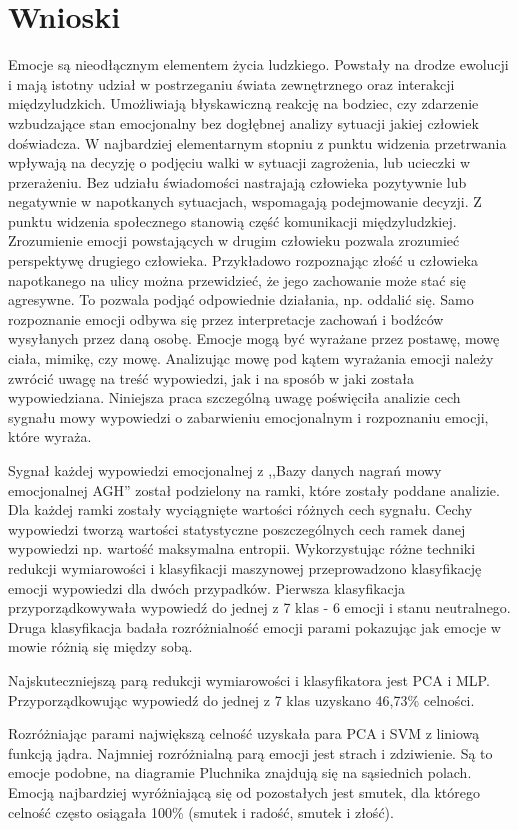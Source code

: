 \documentclass[a4paper,12pt,twoside,openany]{report}
\begin{document}
\chapter{Wnioski}
Emocje są nieodłącznym elementem życia ludzkiego. 
Powstały na drodze ewolucji i mają istotny udział w postrzeganiu świata zewnętrznego oraz interakcji międzyludzkich.
Umożliwiają błyskawiczną reakcję na bodziec, czy zdarzenie wzbudzające stan emocjonalny bez dogłębnej analizy sytuacji jakiej człowiek doświadcza.
W najbardziej elementarnym stopniu z punktu widzenia przetrwania wpływają na decyzję o podjęciu walki w sytuacji zagrożenia, lub ucieczki w przerażeniu.
Bez udziału świadomości nastrajają człowieka pozytywnie lub negatywnie w napotkanych sytuacjach, wspomagają podejmowanie decyzji.
Z punktu widzenia społecznego stanowią część komunikacji międzyludzkiej.
Zrozumienie emocji powstających w drugim człowieku pozwala zrozumieć perspektywę drugiego człowieka.
Przykładowo rozpoznając złość u człowieka napotkanego na ulicy można przewidzieć, że jego zachowanie może stać się agresywne.
To pozwala podjąć odpowiednie działania, np. oddalić się.
Samo rozpoznanie emocji odbywa się przez interpretacje zachowań i bodźców wysyłanych przez daną osobę.
Emocje mogą być wyrażane przez postawę, mowę ciała, mimikę, czy mowę.
Analizując mowę pod kątem wyrażania emocji należy zwrócić uwagę na treść wypowiedzi, jak i na sposób w jaki została wypowiedziana.
Niniejsza praca szczególną uwagę poświęciła analizie cech sygnału mowy wypowiedzi o zabarwieniu emocjonalnym i rozpoznaniu emocji, które wyraża.

Sygnał każdej wypowiedzi emocjonalnej z ,,Bazy danych nagrań mowy emocjonalnej AGH'' został podzielony na ramki, które zostały poddane analizie.
Dla każdej ramki zostały wyciągnięte wartości różnych cech sygnału. 
Cechy wypowiedzi tworzą wartości statystyczne poszczególnych cech ramek danej wypowiedzi np. wartość maksymalna entropii.
Wykorzystując różne techniki redukcji wymiarowości i klasyfikacji maszynowej przeprowadzono klasyfikację emocji wypowiedzi dla dwóch przypadków.
Pierwsza klasyfikacja przyporządkowywała wypowiedź do jednej z 7 klas - 6 emocji i stanu neutralnego.
Druga klasyfikacja badała rozróżnialność emocji parami pokazując jak emocje w mowie różnią się między sobą.

Najskuteczniejszą parą redukcji wymiarowości i klasyfikatora jest PCA i MLP. 
Przyporządkowując wypowiedź do jednej z 7 klas uzyskano 46,73\% celności.

Rozróżniając parami największą celność uzyskała para PCA i SVM z liniową funkcją jądra.
Najmniej rozróżnialną parą emocji jest strach i zdziwienie. 
Są to emocje podobne, na diagramie Pluchnika znajdują się na sąsiednich polach.
Emocją najbardziej wyróżniającą się od pozostałych jest smutek, 
dla którego celność często osiągała 100\% (smutek i radość, smutek i złość).

{}

\end{document}

